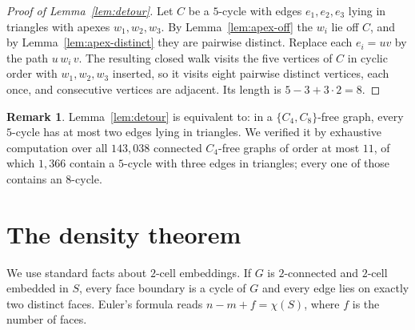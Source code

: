 \documentclass[11pt]{article}
\theoremstyle{plain}
\theoremstyle{definition}
\newtheorem{remark}[theorem]{Remark}
\newcommand{\Cfour}{C_4}
\newcommand{\Ceight}{C_8}
\begin{document}
\begin{proof}[Proof of Lemma~\ref{lem:detour}]
Let $C$ be a $5$-cycle with edges $e_1,e_2,e_3$ lying in triangles with apexes
$w_1,w_2,w_3$. By Lemma~\ref{lem:apex-off} the $w_i$ lie off $C$, and by
Lemma~\ref{lem:apex-distinct} they are pairwise distinct. Replace each $e_i=uv$
by the path $u\,w_i\,v$. The resulting closed walk visits the five vertices of
$C$ in cyclic order with $w_1,w_2,w_3$ inserted, so it visits eight pairwise
distinct vertices, each once, and consecutive vertices are adjacent. Its length
is $5-3+3\cdot2=8$.
\end{proof}

\begin{remark}
Lemma~\ref{lem:detour} is equivalent to: in a $\{\Cfour,\Ceight\}$-free graph,
every $5$-cycle has at most two edges lying in triangles. We verified it by
exhaustive computation over all $143{,}038$ connected $\Cfour$-free graphs of
order at most $11$, of which $1{,}366$ contain a $5$-cycle with three edges in
triangles; every one of those contains an $8$-cycle.
\end{remark}

\section{The density theorem}

We use standard facts about $2$-cell embeddings. If $G$ is $2$-connected and
$2$-cell embedded in $S$, every face boundary is a cycle of $G$ and every edge
lies on exactly two distinct faces. Euler's formula reads $n-m+f=\chi(S)$, where
$f$ is the number of faces.
\end{document}
